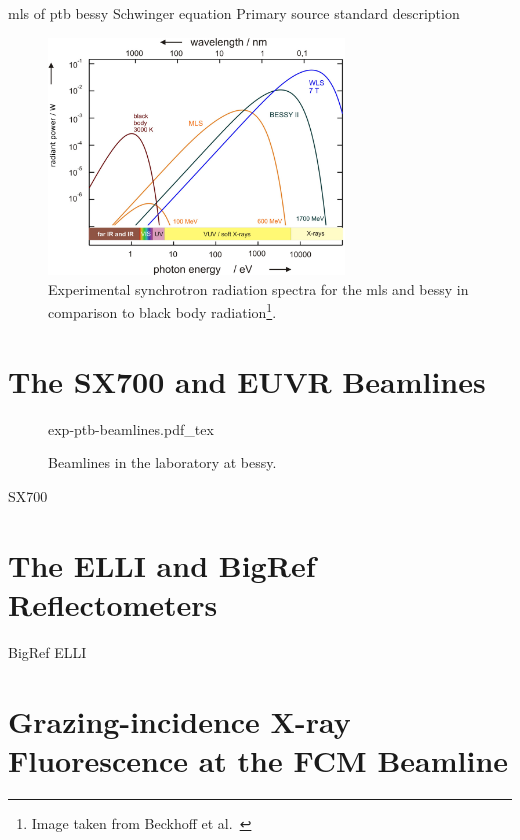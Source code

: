 \Gls{mls} \cite{brandt_metrology_2007} of \gls{ptb}
\Gls{bessy}
Schwinger equation \cite{schwinger_classical_1949}
Primary source standard \cite{thornagel_electron_2001}
description \cite{munro_chapter_1987}
\begin{figure}
 \includegraphics[width=0.7\textwidth]{img/exp-bessy-dipole-spectrum.jpeg}
 \caption[Experimental synchrotron radiation spectra]{Experimental synchrotron radiation spectra for the \gls{mls} and \gls{bessy} in comparison to black body radiation\footnote{Image taken from Beckhoff et al.~\cite{beckhoff_quarter-century_2009}}.}
 \label{ch_exp:fig_experimental_synchrotron_spectra}
\end{figure}


\section{The SX700 and EUVR Beamlines}
\begin{figure}[htb]
    \def\svgwidth{\textwidth}
    {exp-ptb-beamlines.pdf_tex}
    \caption[PTB Beamlines in the BESSY II laboratory.]{Beamlines in the laboratory at \gls{bessy}.}
    \label{ch_exp:fig_beamlines_bessy}
\end{figure}
SX700 \cite{beckhoff_quarter-century_2009}
\section{The ELLI and BigRef Reflectometers}
BigRef \cite{scholze_high-accuracy_2001}
ELLI \cite{soltwisch_polarization_2015}
\section{Grazing-incidence X-ray Fluorescence at the FCM Beamline}